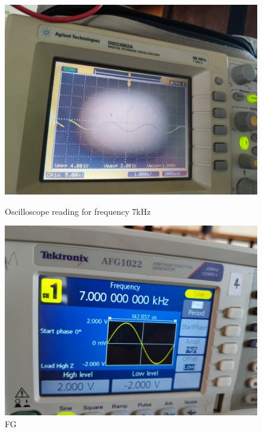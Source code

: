\documentclass[a4paper,12pt]{article}
\begin{document}
\begin{figure}[H]
    \centering
    \begin{minipage}[b]{0.45\textwidth}
        \centering
        \includegraphics[width=\textwidth]{fig/hp/7ko.jpeg}
        \caption{Oscilloscope reading for frequency 7kHz}
    \end{minipage}
    \hfill
    \begin{minipage}[b]{0.45\textwidth}
        \centering
        \includegraphics[width=\textwidth]{fig/hp/7k.jpeg}
        \caption{FG}
    \end{minipage}
\end{figure}
\end{document}

